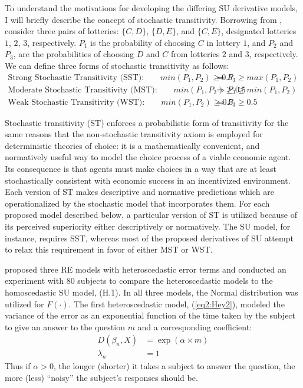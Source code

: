 \documentclass[../main.tex]{subfiles}
\begin{document}
To understand the motivations for developing the differing SU derivative models, I will briefly describe the concept of stochastic transitivity.
Borrowing from \textcite[210]{Wilcox2008}, consider three pairs of lotteries: $\{C,D\}$, $\{D,E\}$, and $\{C,E\}$, designated lotteries $1$, $2$, $3$, respectively.
$P_1$ is the probability of choosing $C$ in lottery $1$, and $P_2$ and $P_3$, are the probabilities of choosing $D$ and $C$ from lotteries $2$ and $3$, respectively.
We can define three forms of stochastic transitivity as follows:
\begin{align*}
	\text{Strong Stochastic Transitivity (SST):} \qquad \mathit{min}(P_1,P_2) \geq 0.5 &\Rightarrow P_3 \geq \mathit{max}(P_1,P_2) \\
	\text{Moderate Stochastic Transitivity (MST):} \qquad \mathit{min}(P_1,P_2) \geq 0.5 &\Rightarrow P_3 \geq \mathit{min}(P_1,P_2)\\
	\text{Weak Stochastic Transitivity (WST):} \qquad \mathit{min}(P_1,P_2) \geq 0.5 &\Rightarrow P_3 \geq 0.5
\end{align*}

Stochastic transitivity (ST) enforces a probabilistic form of transitivity for the same reasons that the non-stochastic transitivity axiom is employed for deterministic theories of choice: it is a mathematically convenient, and normatively useful way to model the choice process of a viable economic agent.
Its consequence is that agents must make choices in a way that are at least stochastically consistent with economic success in an incentivized environment.
Each version of ST makes descriptive and normative predictions which are operationalized by the stochastic model that incorporates them.
For each proposed model described below, a particular version of ST is utilized because of its perceived superiority either descriptively or normatively.
The SU model, for instance, requires SST, whereas most of the proposed derivatives of SU attempt to relax this requirement in favor of either MST or WST.

\textcite{Hey1995a} proposed three RE models with heteroscedastic error terms and conducted an experiment with 80 subjects to compare the heteroscedastic models to the homoscedastic SU model, (H.1).
In all three models, the Normal distribution was utilized for $F(\cdot)$.
The first heteroscedastic model, (\ref{eq2:Hey2}), modeled the variance of the error as an exponential function of the time taken by the subject to give an answer to the question $m$ and a corresponding coefficient:
\begin{align*}
	\tag{H.2}
	\label{eq2:Hey2}
	D(\beta_n,X) &= \exp(\alpha \times m)\\
	\lambda_n &= 1
\end{align*}
Thus if $\alpha > 0$, the longer (shorter) it takes a subject to answer the question, the more (less) \enquote{noisy} the subject's responses should be.
\end{document}

